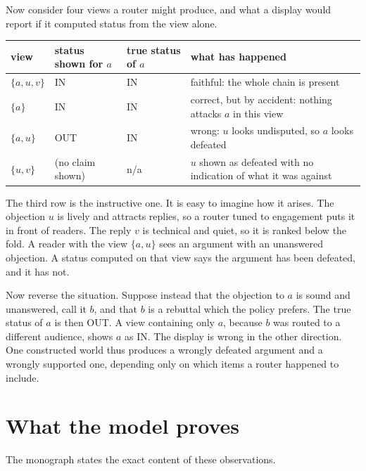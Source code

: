 \documentclass[11pt]{article}
\newcommand{\IN}{\textsf{IN}}
\newcommand{\OUT}{\textsf{OUT}}
\begin{document}
Now consider four views a router might produce, and what a display would report if it computed status from the view alone.

\begin{center}
\small
\begin{tabularx}{\textwidth}{@{}l l X X@{}}
\toprule
view & status shown for $a$ & true status of $a$ & what has happened\\
\midrule
$\{a,u,v\}$ & \IN{} & \IN{} & faithful: the whole chain is present\\
$\{a\}$ & \IN{} & \IN{} & correct, but by accident: nothing attacks $a$ in this view\\
$\{a,u\}$ & \OUT{} & \IN{} & wrong: $u$ looks undisputed, so $a$ looks defeated\\
$\{u,v\}$ & (no claim shown) & n/a & $u$ shown as defeated with no indication of what it was against\\
\bottomrule
\end{tabularx}
\end{center}

The third row is the instructive one. It is easy to imagine how it arises. The objection $u$ is lively and attracts replies, so a router tuned to engagement puts it in front of readers. The reply $v$ is technical and quiet, so it is ranked below the fold. A reader with the view $\{a,u\}$ sees an argument with an unanswered objection. A status computed on that view says the argument has been defeated, and it has not.

Now reverse the situation. Suppose instead that the objection to $a$ is sound and unanswered, call it $b$, and that $b$ is a rebuttal which the policy prefers. The true status of $a$ is then \OUT. A view containing only $a$, because $b$ was routed to a different audience, shows $a$ as \IN. The display is wrong in the other direction. One constructed world thus produces a wrongly defeated argument and a wrongly supported one, depending only on which items a router happened to include.

\section{What the model proves}\label{sec:proves}

The monograph states the exact content of these observations.
\end{document}
